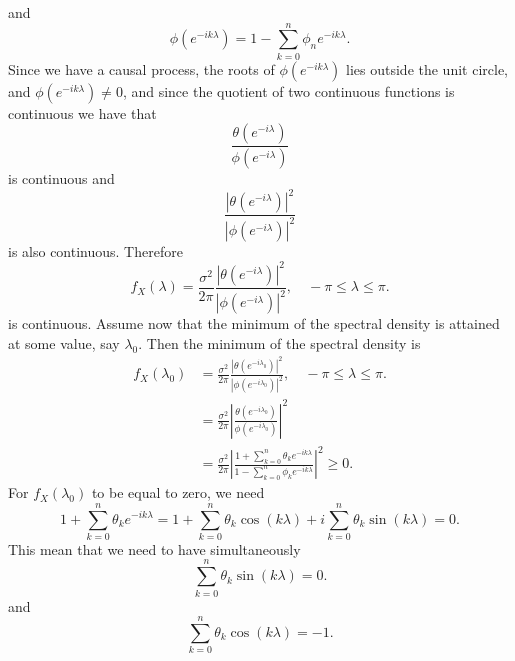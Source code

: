\documentclass[11pt, oneside]{article}   	%
\begin{document}
and
\begin{equation}
\phi(e^{-ik\lambda}) = 1-\sum_{k=0}^{n}\phi_{n}e^{-ik\lambda}.  \nonumber
\end{equation}
Since we have a causal process, the roots of $\phi(e^{-ik\lambda})$ lies outside the unit circle, and $\phi(e^{-ik\lambda}) \neq 0$, and since 
the quotient of two continuous functions is continuous we have that
\begin{equation}
\frac{\theta(e^{-i\lambda}) }{\phi(e^{-i\lambda}) }  \nonumber
\end{equation}
is continuous
and 
\begin{equation}
\frac{| \theta(e^{-i\lambda}) |^{2}}{| \phi(e^{-i\lambda}) |^{2}}  \nonumber
\end{equation}
is also continuous. Therefore 
\begin{equation}
f_{X}(\lambda) = \frac{\sigma^{2}}{2\pi}\frac{| \theta(e^{-i\lambda}) |^{2}}{| \phi(e^{-i\lambda}) |^{2}}, \quad -\pi \leq \lambda \leq \pi.  \nonumber
\end{equation}
is continuous.
\justify
Assume now that the minimum of the spectral density is attained at some value, say $\lambda_{0}$. Then the minimum of the spectral density is 
\begin{equation}
\begin{split}
f_{X}(\lambda_{0}) &= \frac{\sigma^{2}}{2\pi}\frac{| \theta(e^{-i\lambda_{0}}) |^{2}}{| \phi(e^{-i\lambda_{0}}) |^{2}}, \quad -\pi \leq \lambda \leq \pi.\\
&=\frac{\sigma^{2}}{2\pi}\left|\frac{ \theta(e^{-i\lambda_{0}}) }{ \phi(e^{-i\lambda_{0}})}\right|^{2} \\
&=\frac{\sigma^{2}}{2\pi}\left|\frac{ 1+\sum_{k=0}^{n}\theta_{k}e^{-ik\lambda}}{ 1-\sum_{k=0}^{n}\phi_{k}e^{-ik\lambda}}\right|^{2} \geq 0.  \nonumber
\end{split}
\end{equation}
For $f_{X}(\lambda_{0})$ to be equal to zero, we need 
\begin{equation}
1+\sum_{k=0}^{n}\theta_{k}e^{-ik\lambda} = 1+ \sum_{k=0}^{n}\theta_{k}\cos(k\lambda) + i\sum_{k=0}^{n}\theta_{k}\sin(k\lambda) = 0.  \nonumber
\end{equation}
This mean that we need to have simultaneously 
\begin{equation}
\sum_{k=0}^{n}\theta_{k}\sin(k\lambda) = 0.  \nonumber
\end{equation}
and 
\begin{equation}
 \sum_{k=0}^{n}\theta_{k}\cos(k\lambda)  = -1.  \nonumber
\end{equation}
\end{document}
